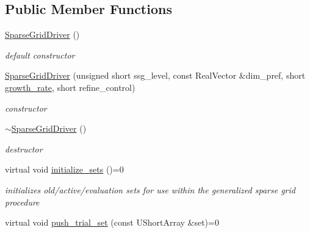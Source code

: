 \subsection*{Public Member Functions}
\begin{DoxyCompactItemize}
\item 
\hyperlink{classPecos_1_1SparseGridDriver_af7b778bb7e37baca5ed395f7e977c213}{Sparse\+Grid\+Driver} ()\label{classPecos_1_1SparseGridDriver_af7b778bb7e37baca5ed395f7e977c213}

\begin{DoxyCompactList}\small\item\em default constructor \end{DoxyCompactList}\item 
\hyperlink{classPecos_1_1SparseGridDriver_aafe271be573d9679135d112d02a274ca}{Sparse\+Grid\+Driver} (unsigned short ssg\+\_\+level, const Real\+Vector \&dim\+\_\+pref, short \hyperlink{classPecos_1_1SparseGridDriver_a6f9061513ba25c62ee7a49b0d5da42cc}{growth\+\_\+rate}, short refine\+\_\+control)\label{classPecos_1_1SparseGridDriver_aafe271be573d9679135d112d02a274ca}

\begin{DoxyCompactList}\small\item\em constructor \end{DoxyCompactList}\item 
\hyperlink{classPecos_1_1SparseGridDriver_abc9dcbd249abe4eff14299f5fb93c3c7}{$\sim$\+Sparse\+Grid\+Driver} ()\label{classPecos_1_1SparseGridDriver_abc9dcbd249abe4eff14299f5fb93c3c7}

\begin{DoxyCompactList}\small\item\em destructor \end{DoxyCompactList}\item 
virtual void \hyperlink{classPecos_1_1SparseGridDriver_a6a15c211b631e3a8f865a03dd8926f56}{initialize\+\_\+sets} ()=0\label{classPecos_1_1SparseGridDriver_a6a15c211b631e3a8f865a03dd8926f56}

\begin{DoxyCompactList}\small\item\em initializes old/active/evaluation sets for use within the generalized sparse grid procedure \end{DoxyCompactList}\item 
virtual void \hyperlink{classPecos_1_1SparseGridDriver_a0d967c54a2f89a28ac1c406a5aaaae07}{push\+\_\+trial\+\_\+set} (const U\+Short\+Array \&set)=0\label{classPecos_1_1SparseGridDriver_a0d967c54a2f89a28ac1c406a5aaaae07}


\end{DoxyCompactItemize}
